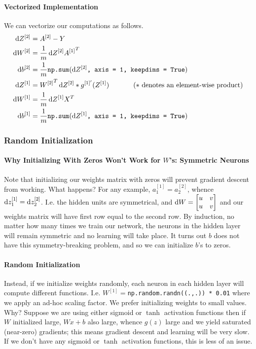 \documentclass[12pt]{article}
\begin{document}
\paragraph{Vectorized Implementation}
We can vectorize our computations as follows.
\begin{align*}   \d Z^{[2]} &= A^{[2]} - Y \\
  \d W^{[2]} &= \frac{1}{m} \d Z^{[2]} {A^{[1]}}^T \\
  \d b^{[2]} &= \frac{1}{m} \texttt{np.sum}(\d Z^{[2]}\texttt{, axis = 1, keepdims = True}) \\
  \d Z^{[1]} &= {W^{[2]}}^T \d Z^{[2]} * g^{[1]'}(Z^{[1]}) \hspace{35pt} (* \textrm{ denotes an element-wise product})\\
  \d W^{[1]} &= \frac{1}{m} \d Z^{[1]} X^T \\ 
  \d b^{[1]} &= \frac{1}{m} \texttt{np.sum}(\d Z^{[1]}\texttt{, axis = 1, keepdims = True}) \end{align*}

\subsubsection{Random Initialization}
\paragraph{Why Initializing With Zeros Won't Work for $W$'s: Symmetric Neurons}
Note that initializing our weights matrix with zeros will prevent gradient descent from working. What happens? For any example, $a_1^{[1]} = a_2^{[2]}$, whence $\operatorname{d}\!{z}_1^{[1]} = \operatorname{d}\!{z}_2^{[2]}$. I.e. the hidden units are symmetrical, and $\operatorname{d}\!{W} = \begin{bmatrix}   u & v \\ u & v \end{bmatrix}$ and our weights matrix will have first row equal to the second row. By induction, no matter how many times we train our network, the neurons in the hidden layer will remain symmetric and no learning will take place. 
It turns out $b$ does not have this symmetry-breaking problem, and so we can initialize $b$'s to zeros.

\paragraph{Random Initialization}
Instead, if we initialize weights randomly, each neuron in each hidden layer will compute different functions. I.e. $W^{[1]} = $\texttt{np.random.randn((.,.)) * 0.01} where we apply an ad-hoc scaling factor. We prefer initializing weights to small values. Why? Suppose we are using either sigmoid or $\tanh$ activation functions then if $W$ initialized large, $Wx + b$ also large, whence $g(z)$ large and we yield saturated (near-zero) gradients; this means gradient descent and learning will be very slow. If we don't have any sigmoid or $\tanh$ activation functions, this is less of an issue. 
\end{document}
